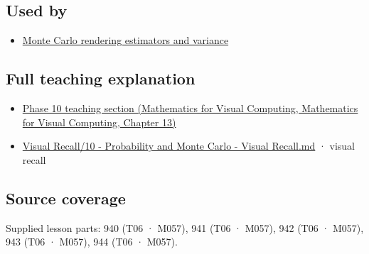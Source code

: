\subsection{Used by}\label{appendix-8d863ed954d0-used-by}

\begin{itemize}
\tightlist
\item
  \hyperref[appendix-031e02bf28af]{Monte Carlo rendering estimators and variance}
\end{itemize}

\subsection{Full teaching explanation}\label{appendix-8d863ed954d0-full-teaching-explanation}

\begin{itemize}
\tightlist
\item
  \href{../02-Mathematics-for-Visual-Computing/main.pdf\#nameddest=02-foundations-ii-ch029-transformations-turn-simple-inputs-into-useful-samples}{Phase 10 teaching section (Mathematics for Visual Computing, Mathematics for Visual Computing, Chapter 13)}
\item
  \hyperref[appendix-cb5af353ef77]{Visual Recall/10 - Probability and Monte Carlo - Visual Recall.md} · visual recall
\end{itemize}

\subsection{Source coverage}\label{appendix-8d863ed954d0-source-coverage}

Supplied lesson parts: 940 (T06 · M057), 941 (T06 · M057), 942 (T06 · M057), 943 (T06 · M057), 944 (T06 · M057).
